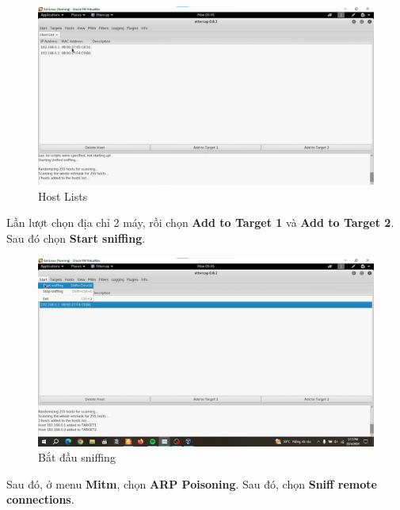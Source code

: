 \begin{figure}[!htb]
    \centering
    \includegraphics[width=1\linewidth]{figure//chapter5//lab5_3/host-list_2.png}
    \caption{Host Lists}
    \label{fig:enter-label}
\end{figure}


 Lần lượt chọn địa chỉ 2 máy, rồi chọn \textbf{Add to Target 1} và \textbf{Add to Target 2}. Sau đó chọn \textbf{Start sniffing}.

\begin{figure}[!htb]
    \centering
    \includegraphics[width=1\linewidth]{figure//chapter5//lab5_3/start_sniffing.png}
    \caption{Bắt đầu sniffing}
    \label{fig:enter-label}
\end{figure}

\newpage

 Sau đó, ở menu \textbf{Mitm}, chọn \textbf{ARP Poisoning}. Sau đó, chọn \textbf{Sniff remote connections}.

